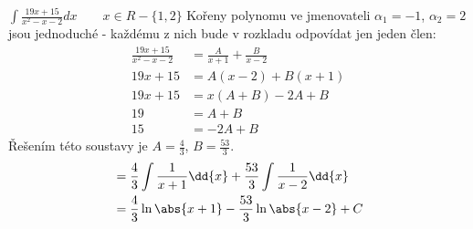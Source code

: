 \begin{mdframed}[style=mdexam]
  \begin{example}\label{MAI:exam129} $\displaystyle\int{\frac{19x+15}{x^2-x-2}}dx \qquad x\in
    R-\{1,2\} $ \newline Kořeny polynomu ve jmenovateli $\alpha_1 = -1$, $\alpha_2 = 2$ jsou
    jednoduché - každému z nich bude v rozkladu odpovídat jen jeden člen: 
      \begin{align*}
        \frac{19x+15}{x^2-x-2}     &= \frac{A}{x+1} + \frac{B}{x-2} \\
                         19x +15   &= A(x-2) + B(x+1)               \\
                         19x +15   &= x(A+B) - 2A + B               \\
                         19        &= A + B                         \\
                              15   &=        - 2A + B
      \end{align*}              
      Řešením této soustavy je $A = \frac{4}{3}$, $B = \frac{53}{3}$.
      \begin{align*}
        &= \frac{4}{3}\int{\frac{1}{x+1}}\dd{x} + \frac{53}{3}\int{\frac{1}{x-2}}\dd{x}  \\
        &= \frac{4}{3}\ln\abs{x+1} - \frac{53}{3}\ln\abs{x-2} +  C
      \end{align*}   
  \end{example}
\end{mdframed}